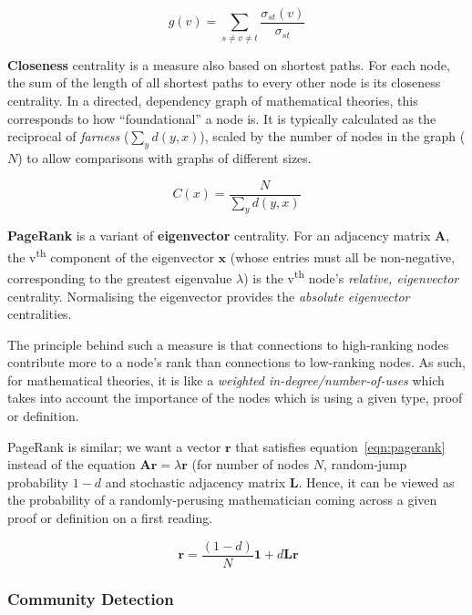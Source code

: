 \begin{equation}
  g\left(v\right) = \sum_{s \neq v \neq t} \frac{\sigma_{st}\left(v\right)}{\sigma_{st}}
\end{equation}

\textbf{Closeness} centrality is a measure also based on shortest paths. For
each node, the sum of the length of all shortest paths to every other node is
its closeness centrality. In a directed, dependency graph of mathematical
theories, this corresponds to how ``foundational'' a node is. It is typically
calculated as the reciprocal of \emph{farness} ($\sum_{y}d\left(y,x\right)$),
scaled by the number of nodes in the graph ($N$) to allow comparisons with
graphs of different sizes.~\cite{bavelas1950}

\begin{equation}
  C\left(x\right) = \frac{N}{\sum_{y}d\left(y,x\right)}
\end{equation}

\textbf{PageRank} is a variant of \textbf{eigenvector} centrality.  For an
adjacency matrix $\mathbf{A}$, the v\textsuperscript{th} component of the
eigenvector $\mathbf{x}$ (whose entries must all be non-negative, corresponding
to the greatest eigenvalue $\lambda$) is the v\textsuperscript{th} node's
\emph{relative, eigenvector} centrality. Normalising the eigenvector provides
the \emph{absolute eigenvector} centralities.~\cite{newman2008}

The principle behind such a measure is that connections to high-ranking nodes
contribute more to a node's rank than connections to low-ranking nodes.  As
such, for mathematical theories, it is like a \emph{weighted
in-degree/number-of-uses} which takes into account the importance of the nodes
which is using a given type, proof or definition.

PageRank is similar; we want a vector $\mathbf{r}$ that satisfies
equation~\ref{eqn:pagerank}~\cite{page1999} instead of the equation $\mathbf{Ar}
= \lambda\mathbf{r}$ (for number of nodes $N$, random-jump probability $1-d$ and
stochastic adjacency matrix $\mathbf{L}$. Hence, it can be viewed as the
probability of a randomly-perusing mathematician coming across a given proof or
definition on a first reading.

\begin{equation}~\label{eqn:pagerank}
  \mathbf{r} = \frac{\left(1-d\right)}{N} \mathbf{1} + d\mathbf{Lr}
\end{equation}

\subsubsection{Community Detection}

